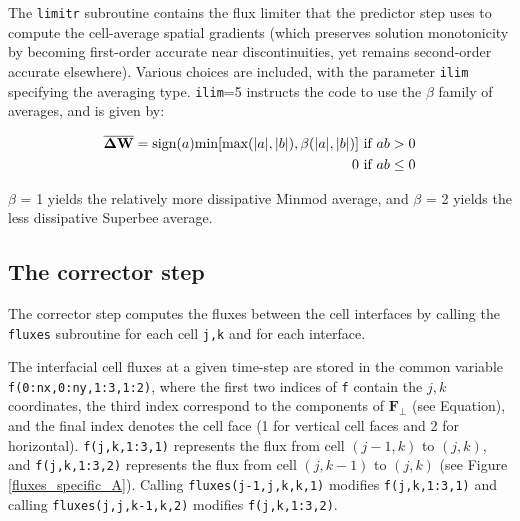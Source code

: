 \documentclass{article}
\newcommand{\code}[1]{\texttt{#1}}
\begin{document}
The \code{limitr} subroutine contains the flux limiter that the predictor step uses to compute the cell-average spatial gradients (which preserves solution monotonicity by becoming first-order accurate near discontinuities, yet remains second-order accurate elsewhere).
Various choices are included, with the parameter \code{ilim} specifying the averaging type. \code{ilim}=5 instructs the code to use the $\beta$ family of averages, and is given by:

\begin{eqnarray*}
	\mathbf{\overline{\Delta W}} = \text{sign}(a)\text{min}[\text{max}(|a|, |b|), \beta(|a|, |b|)]  \textmd{  if }  ab>0  \\ 
	0 \textmd{ if }  ab \leq 0	
\end{eqnarray*}

$\beta$ = 1 yields the relatively more dissipative Minmod average, and $\beta $ = 2 yields the less dissipative Superbee average. 


\subsection{The corrector step}

The corrector step computes the fluxes between the cell interfaces by calling the \code{fluxes} subroutine for each cell \code{j,k} and for each interface. 

The interfacial cell fluxes at a given time-step are stored in the common variable \code{f(0:nx,0:ny,1:3,1:2)}, where the first two indices of \code{f} contain the $j,k$ coordinates, the third index correspond to the components of  $\mathbf{F_\perp}$ (see Equation), and the final index denotes the cell face (1 for vertical cell faces and 2 for horizontal).   
\code{f(j,k,1:3,1)} represents the flux from cell $(j-1, k)$ to $(j, k)$, and
\code{f(j,k,1:3,2)} represents the flux from cell $(j, k-1)$ to $(j, k)$ (see Figure \ref{fluxes_specific_A}).
Calling \code{fluxes(j-1,j,k,k,1)} modifies \code{f(j,k,1:3,1)}  and calling \code{fluxes(j,j,k-1,k,2)} modifies \code{f(j,k,1:3,2)}.
\end{document}
